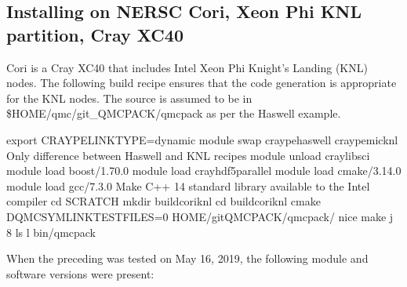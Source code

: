 \documentclass[letterpaper,10pt,english]{sphinxmanual}
\begin{document}
\subsection{Installing on NERSC Cori, Xeon Phi KNL partition, Cray XC40}
\label{\detokenize{installation:installing-on-nersc-cori-xeon-phi-knl-partition-cray-xc40}}
Cori is a Cray XC40 that includes Intel Xeon Phi Knight’s Landing (KNL) nodes. The following build recipe ensures that the code
generation is appropriate for the KNL nodes. The source is assumed to
be in \$HOME/qmc/git\_QMCPACK/qmcpack as per the Haswell example.

\begin{sphinxVerbatim}[commandchars=\\\{\}]
export CRAYPE\PYGZus{}LINK\PYGZus{}TYPE=dynamic
module swap craype\PYGZhy{}haswell craype\PYGZhy{}mic\PYGZhy{}knl \PYGZsh{} Only difference between Haswell and KNL recipes
module unload cray\PYGZhy{}libsci
module load boost/1.70.0
module load cray\PYGZhy{}hdf5\PYGZhy{}parallel
module load cmake/3.14.0
module load gcc/7.3.0 \PYGZsh{} Make C++ 14 standard library available to the Intel compiler
cd \PYGZdl{}SCRATCH
mkdir build\PYGZus{}cori\PYGZus{}knl
cd build\PYGZus{}cori\PYGZus{}knl
cmake \PYGZhy{}DQMC\PYGZus{}SYMLINK\PYGZus{}TEST\PYGZus{}FILES=0 \PYGZdl{}HOME/git\PYGZus{}QMCPACK/qmcpack/
nice make \PYGZhy{}j 8
ls \PYGZhy{}l bin/qmcpack
\end{sphinxVerbatim}

When the preceding was tested on May 16, 2019, the following module and
software versions were present:
\end{document}
